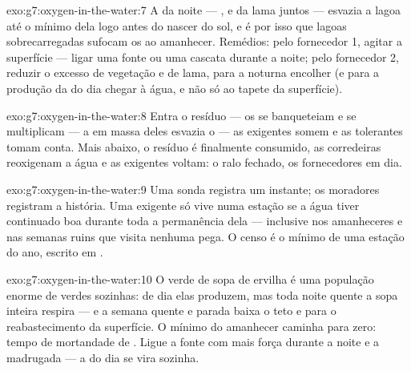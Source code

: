 \begin{solution}{exo:g7:oxygen-in-the-water:7}
A  da noite --- ,  e  da lama
juntos --- esvazia a lagoa até o mínimo dela logo antes do nascer do
sol, e é por isso que lagoas sobrecarregadas sufocam os  ao
amanhecer. Remédios: pelo fornecedor 1, agitar a superfície --- ligar
uma fonte ou uma cascata durante a noite; pelo fornecedor 2, reduzir o
excesso de vegetação e de lama, para a  noturna encolher (e
para a produção da  do dia chegar à água, e não só ao tapete da
superfície).
\end{solution}

\begin{solution}{exo:g7:oxygen-in-the-water:8}
Entra o resíduo --- os  se banqueteiam e se multiplicam
--- a  em massa deles esvazia o  --- as 
exigentes somem e as tolerantes tomam conta. Mais abaixo, o resíduo é
finalmente consumido, as corredeiras reoxigenam a água e as 
exigentes voltam: o ralo fechado, os fornecedores em dia.
\end{solution}

\begin{solution}{exo:g7:oxygen-in-the-water:9}
Uma sonda registra um instante; os moradores registram a história. Uma
 exigente só vive numa estação se a água tiver continuado boa
durante toda a permanência dela --- inclusive nos amanheceres e nas
semanas ruins que visita nenhuma pega. O censo é o mínimo de uma
estação do ano, escrito em .
\end{solution}

\begin{solution}{exo:g7:oxygen-in-the-water:10}
O verde de sopa de ervilha é uma população enorme de  verdes
sozinhas: de dia elas produzem, mas toda noite quente a sopa inteira
respira --- e a semana quente e parada baixa o teto e para o
reabastecimento da superfície. O mínimo do amanhecer caminha para
zero: tempo de mortandade de . Ligue a fonte com mais força
durante a noite e a madrugada --- a  do dia se vira sozinha.
\end{solution}

